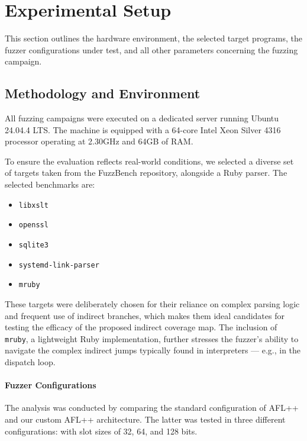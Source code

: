\section{Experimental Setup}

This section outlines the hardware environment, the selected target programs, the fuzzer configurations under test, and all other parameters concerning the fuzzing campaign.

\subsection{Methodology and Environment}

All fuzzing campaigns were executed on a dedicated server running Ubuntu 24.04.4 LTS. The machine is equipped with a 64-core Intel Xeon Silver 4316 processor operating at 2.30GHz and 64GB of RAM.

To ensure the evaluation reflects real-world conditions, we selected a diverse set of targets taken from the FuzzBench repository, alongside a Ruby parser. The selected benchmarks are: 
\begin{itemize}
    \item \texttt{libxslt}
    
    \item \texttt{openssl}
    
    \item \texttt{sqlite3}
    
    \item \texttt{systemd-link-parser}
    
    \item \texttt{mruby}
\end{itemize}

These targets were deliberately chosen for their reliance on complex parsing logic and frequent use of indirect branches, which makes them ideal candidates for testing the efficacy of the proposed indirect coverage map. The inclusion of \texttt{mruby}, a lightweight Ruby implementation, further stresses the fuzzer's ability to navigate the complex indirect jumps typically found in interpreters --- e.g., in the dispatch loop.

\paragraph{Fuzzer Configurations} The analysis was conducted by comparing the standard configuration of AFL++ and our custom AFL++ architecture. The latter was tested in three different configurations: with slot sizes of 32, 64, and 128 bits.

